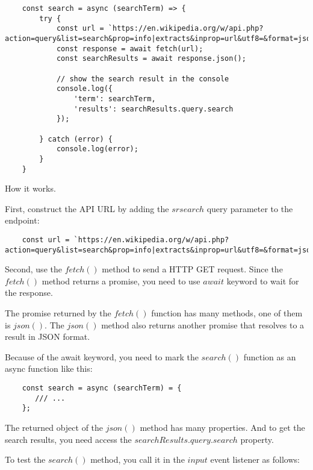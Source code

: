 \documentclass[11pt]{article}
\begin{document}
\begin{lstlisting}
    const search = async (searchTerm) => {
        try {
            const url = `https://en.wikipedia.org/w/api.php?action=query&list=search&prop=info|extracts&inprop=url&utf8=&format=json&origin=*&srlimit=10&srsearch=${searchTerm}`;
            const response = await fetch(url);
            const searchResults = await response.json();

            // show the search result in the console
            console.log({
                'term': searchTerm,
                'results': searchResults.query.search
            });

        } catch (error) {
            console.log(error);
        }
    }
\end{lstlisting}

\noindent
How it works.
\newline

\noindent
First, construct the API URL by adding the $srsearch$ query parameter
to the endpoint:

\begin{lstlisting}
    const url = `https://en.wikipedia.org/w/api.php?action=query&list=search&prop=info|extracts&inprop=url&utf8=&format=json&origin=*&srlimit=10&srsearch=${searchTerm}`;
\end{lstlisting}

\noindent
Second, use the $fetch()$ method to send a HTTP GET request. Since
the $fetch()$ method returns a promise, you need to use $await$ keyword
to wait for the response.
\newline

\noindent
The promise returned by the $fetch()$ function has many methods,
one of them is $json()$. The $json()$ method also returns another promise
that resolves to a result in JSON format.
\newline

\noindent
Because of the await keyword, you need to mark the $search()$ function
as an async function like this:

\begin{lstlisting}
    const search = async (searchTerm) = {
       /// ...
    };
\end{lstlisting}

\noindent
The returned object of the $json()$ method has many properties.
And to get the search results, you need access
the $searchResults.query.search$ property.
\newline

\noindent
To test the $search()$ method, you call it in the $input$ event
listener as follows:
\end{document}
